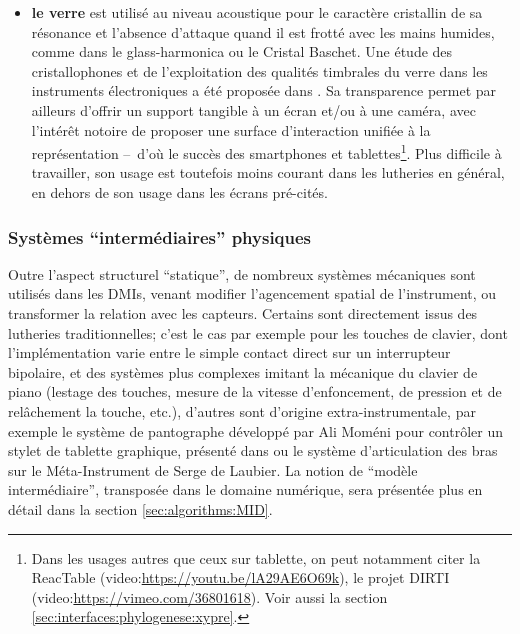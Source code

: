 \begin{itemize}[noitemsep]
	\item \textbf{le verre} est utilisé au niveau acoustique pour le caractère cristallin de sa résonance et l'absence d'attaque quand il est frotté avec les mains humides, comme dans le glass-harmonica ou le Cristal Baschet. Une étude des cristallophones et de l'exploitation des qualités timbrales du verre dans les instruments électroniques a été proposée dans \cite{jensenius_evaluating_2010, frounberg_glass_2010}. Sa transparence permet par ailleurs d'offrir un support tangible à un écran et/ou à une caméra, avec l'intérêt notoire de proposer une surface d'interaction unifiée à la représentation --~d'où le succès des smartphones et tablettes\footnote{Dans les usages autres que ceux sur tablette, on peut notamment citer la ReacTable \cite{jorda_reactable_2005} (video:\url{https://youtu.be/lA29AE6O69k}), le projet DIRTI \cite{savary_dirti_2012} (video:\url{https://vimeo.com/36801618}). Voir aussi la section \ref{sec:interfaces:phylogenese:xypre}.}. Plus difficile à travailler, son usage est toutefois moins courant dans les lutheries en général, en dehors de son usage dans les écrans pré-cités. 
\end{itemize}

\subsubsection{Systèmes ``intermédiaires'' physiques}

\noindent Outre l'aspect structurel ``statique'', de nombreux systèmes mécaniques sont utilisés dans les \glspl{DMI}, venant modifier l'agencement spatial de l'instrument, ou transformer la relation avec les capteurs. Certains sont directement issus des lutheries traditionnelles; c'est le cas par exemple pour les touches de clavier, dont l'implémentation varie entre le simple contact direct sur un interrupteur bipolaire, et des systèmes plus complexes imitant la mécanique du clavier de piano (lestage des touches, mesure de la vitesse d'enfoncement, de pression et de relâchement la touche, etc.), d'autres sont d'origine extra-instrumentale, par exemple le système de pantographe développé par Ali Moméni pour contrôler un stylet de tablette graphique, présenté dans \cite{zbyszynski_ten_2007} ou le système d'articulation des bras sur le Méta-Instrument de Serge de Laubier. La notion de ``modèle intermédiaire'', transposée dans le domaine numérique, sera présentée plus en détail dans la section \ref{sec:algorithms:MID}.

